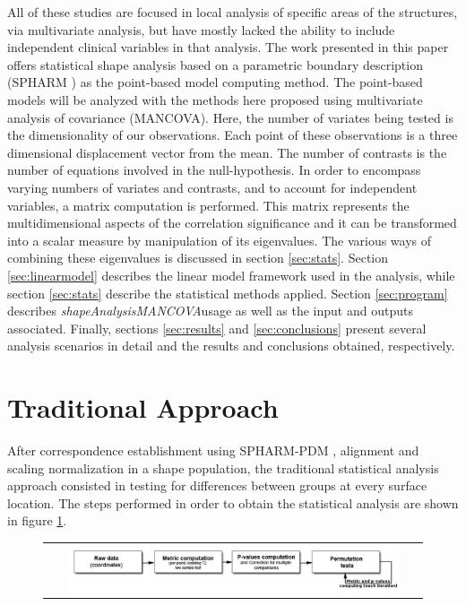 \documentclass{InsightArticle}
\newcommand{\ProgramName}{\textit{shapeAnalysisMANCOVA}}
\begin{document}
All of these studies are focused in local analysis of specific areas of the structures, via multivariate analysis, but have mostly lacked the ability to include independent clinical variables in that analysis. The work presented in this paper offers statistical shape analysis based on a parametric boundary description (SPHARM \cite{Brechbuhler95}) as the point-based model computing method. The point-based models will be analyzed with the methods here proposed using multivariate analysis of covariance (MANCOVA). Here, the number of variates being tested is the dimensionality of our observations. Each point of these observations is a three dimensional displacement vector from the mean. The number of contrasts is the number of equations involved in the null-hypothesis. In order to encompass varying numbers of variates and contrasts, and to account for independent variables, a matrix computation is performed. This matrix represents the multidimensional aspects of the correlation significance and it can be transformed into a scalar measure by manipulation of its eigenvalues. The various ways of combining these eigenvalues is discussed in section \ref{sec:stats}. Section \ref{sec:linearmodel} describes the linear model framework used in the analysis, while section \ref{sec:stats} describe the statistical methods applied. Section \ref{sec:program} describes \ProgramName   usage as well as the input and outputs associated. Finally, sections \ref{sec:results} and \ref{sec:conclusions} present several analysis scenarios in detail and the results and conclusions obtained, respectively. 

\section{Traditional Approach}
\label{sec:tradapproach}

After correspondence establishment using SPHARM-PDM \cite{Brechbuhler95} \cite{Styner06}, alignment and scaling normalization in a shape population, the traditional statistical analysis approach  consisted in testing for differences between groups at every surface location. The steps performed in order to obtain the statistical analysis are shown in figure \ref{fig:tradflow}.

\begin{figure}[htbp]
  \begin{center}
    \begin{tabular}[htbp]{c}
    \includegraphics[width=0.9\textwidth]{IJ_TraditionalAp}
    \end{tabular}
    \label{fig:tradflow}
  \end{center}
\end{figure}
\end{document}

